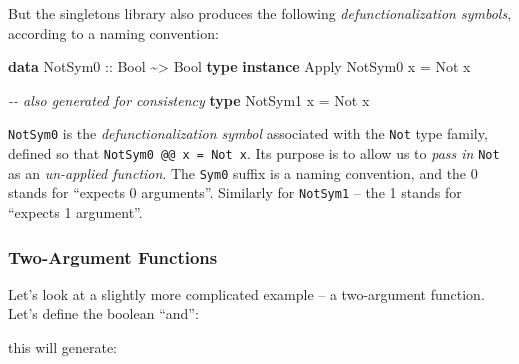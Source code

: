 \documentclass[]{article}
\newenvironment{Shaded}{}{}
\newcommand{\CommentTok}[1]{\textcolor[rgb]{0.38,0.63,0.69}{\textit{#1}}}
\newcommand{\DataTypeTok}[1]{\textcolor[rgb]{0.56,0.13,0.00}{#1}}
\newcommand{\KeywordTok}[1]{\textcolor[rgb]{0.00,0.44,0.13}{\textbf{#1}}}
\newcommand{\NormalTok}[1]{#1}
\newcommand{\OperatorTok}[1]{\textcolor[rgb]{0.40,0.40,0.40}{#1}}
\newcommand{\OtherTok}[1]{\textcolor[rgb]{0.00,0.44,0.13}{#1}}
\begin{document}
But the singletons library also produces the following \emph{defunctionalization
symbols}, according to a naming convention:

\begin{Shaded}
\begin{Highlighting}[]
\KeywordTok{data} \DataTypeTok{NotSym0}\OtherTok{ ::} \DataTypeTok{Bool} \OperatorTok{\textasciitilde{}>} \DataTypeTok{Bool}
\KeywordTok{type} \KeywordTok{instance} \DataTypeTok{Apply} \DataTypeTok{NotSym0}\NormalTok{ x }\OtherTok{=} \DataTypeTok{Not}\NormalTok{ x}

\CommentTok{{-}{-} also generated for consistency}
\KeywordTok{type} \DataTypeTok{NotSym1}\NormalTok{ x }\OtherTok{=} \DataTypeTok{Not}\NormalTok{ x}
\end{Highlighting}
\end{Shaded}

\texttt{NotSym0} is the \emph{defunctionalization symbol} associated with the
\texttt{Not} type family, defined so that \texttt{NotSym0\ @@\ x\ =\ Not\ x}.
Its purpose is to allow us to \emph{pass in} \texttt{Not} as an \emph{un-applied
function}. The \texttt{Sym0} suffix is a naming convention, and the 0 stands for
``expects 0 arguments''. Similarly for \texttt{NotSym1} -- the 1 stands for
``expects 1 argument''.

\hypertarget{two-argument-functions}{%
\subsubsection{Two-Argument Functions}\label{two-argument-functions}}

Let's look at a slightly more complicated example -- a two-argument function.
Let's define the boolean ``and'':

\begin{Shaded}
\end{Shaded}

this will generate:
\end{document}
